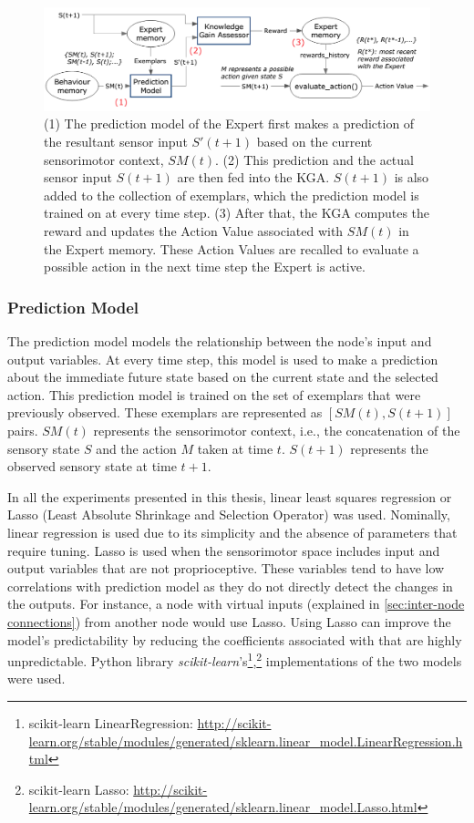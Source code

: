 \begin{figure}[!htbp]
	\centering
	\includegraphics[width=1.0 \textwidth]{"fig/cbla/Block Diagram Expert"}
	\caption[Block diagram of the Expert]{(1) The prediction model of the Expert first makes a prediction of the resultant sensor input $S'(t+1)$ based on the current sensorimotor context, $SM(t)$. (2) This prediction and the actual sensor input $S(t+1)$ are then fed into the KGA. $S(t+1)$ is also added to the collection of exemplars, which the prediction model is trained on at every time step. (3) After that, the KGA computes the reward and updates the Action Value associated with $SM(t)$ in the Expert memory. These Action Values are recalled to evaluate a possible action in the next time step the Expert is active.}
	\label{fig:Block Diagram Expert}
\end{figure}

\subsubsection{Prediction Model}

The prediction model models the relationship between the node's input and output variables. At every time step, this model is used to make a prediction about the immediate future state based on the current state and the selected action. This prediction model is trained on the set of exemplars that were previously observed. These exemplars are represented as $[SM(t),S(t+1)]$ pairs. $SM(t)$ represents the sensorimotor context, i.e., the concatenation of the sensory state $S$ and the action $M$ taken at time $t$. $S(t+1)$ represents the observed sensory state at time $t+1$. 

In all the experiments presented in this thesis, linear least squares regression or Lasso (Least Absolute Shrinkage and Selection Operator) \cite{Tibshirani1996} was used. Nominally, linear regression is used due to its simplicity and the absence of parameters that require tuning. Lasso is used when the sensorimotor space includes input and output variables that are not proprioceptive. These variables tend to have low correlations with prediction model as they do not directly detect the changes in the outputs. For instance, a node with virtual inputs (explained in \ref{sec:inter-node connections}) from another node would use Lasso. Using Lasso can improve the model's predictability by reducing the coefficients associated with that are highly unpredictable. Python library \textit{scikit-learn}'s\footnote{scikit-learn LinearRegression: \url{http://scikit-learn.org/stable/modules/generated/sklearn.linear_model.LinearRegression.html}},\footnote{scikit-learn Lasso: \url{http://scikit-learn.org/stable/modules/generated/sklearn.linear_model.Lasso.html}} implementations of the two models were used. 

